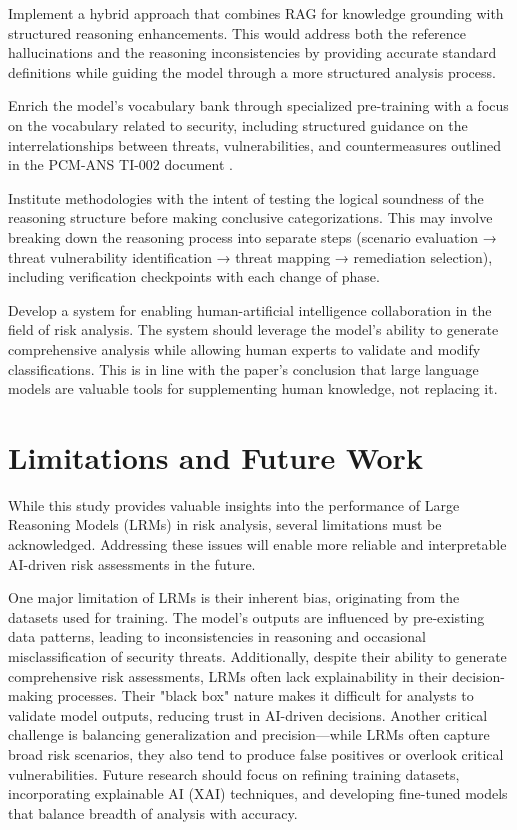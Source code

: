 \documentclass[sigconf]{acmart}
\begin{document}
Implement a hybrid approach that combines RAG for knowledge grounding with structured reasoning enhancements. This would address both the reference hallucinations and the reasoning inconsistencies by providing accurate standard definitions while guiding the model through a more structured analysis process.

Enrich the model's vocabulary bank through specialized pre-training with a focus on the vocabulary related to security, including structured guidance on the interrelationships between threats, vulnerabilities, and countermeasures outlined in the PCM-ANS TI-002 document \citep{NationalSecurity1995}.

Institute methodologies with the intent of testing the logical soundness of the reasoning structure before making conclusive categorizations. This may involve breaking down the reasoning process into separate steps (scenario evaluation → threat vulnerability identification → threat mapping → remediation selection), including verification checkpoints with each change of phase.

Develop a system for enabling human-artificial intelligence collaboration in the field of risk analysis. The system should leverage the model's ability to generate comprehensive analysis while allowing human experts to validate and modify classifications. This is in line with the paper's conclusion that large language models are valuable tools for supplementing human knowledge, not replacing it.

\section{Limitations and Future Work}
While this study provides valuable insights into the performance of Large Reasoning Models (LRMs) in risk analysis, several limitations must be acknowledged. Addressing these issues will enable more reliable and interpretable AI-driven risk assessments in the future.

One major limitation of LRMs is their inherent bias, originating from the datasets used for training. The model's outputs are influenced by pre-existing data patterns, leading to inconsistencies in reasoning and occasional misclassification of security threats. Additionally, despite their ability to generate comprehensive risk assessments, LRMs often lack explainability in their decision-making processes. Their "black box" nature makes it difficult for analysts to validate model outputs, reducing trust in AI-driven decisions. Another critical challenge is balancing generalization and precision—while LRMs often capture broad risk scenarios, they also tend to produce false positives or overlook critical vulnerabilities. Future research should focus on refining training datasets, incorporating explainable AI (XAI) techniques, and developing fine-tuned models that balance breadth of analysis with accuracy.
\end{document}
